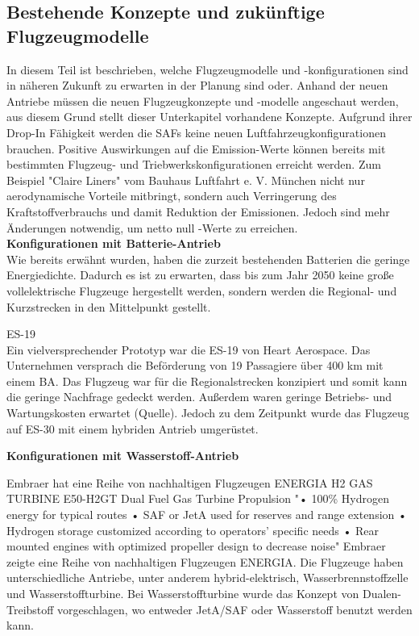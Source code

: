 \subsection{Bestehende Konzepte und zukünftige Flugzeugmodelle}
In diesem Teil ist beschrieben, welche Flugzeugmodelle und -konfigurationen sind in näheren Zukunft zu erwarten in der Planung sind oder.
Anhand der neuen Antriebe müssen die neuen Flugzeugkonzepte und -modelle angeschaut werden, 
aus diesem Grund stellt dieser Unterkapitel vorhandene Konzepte.
Aufgrund ihrer Drop-In Fähigkeit werden die SAFs keine neuen Luftfahrzeugkonfigurationen brauchen.
Positive Auswirkungen auf die Emission-Werte können bereits mit bestimmten Flugzeug- und Triebwerkskonfigurationen erreicht werden.
Zum Beispiel "Claire Liners" vom Bauhaus Luftfahrt e. V. München nicht nur aerodynamische Vorteile mitbringt, 
sondern auch Verringerung des Kraftstoffverbrauchs und damit Reduktion der Emissionen.
Jedoch sind mehr Änderungen notwendig, um netto null \cite{CO2}-Werte zu erreichen.
\\
\textbf{Konfigurationen mit Batterie-Antrieb}\\
Wie bereits erwähnt wurden, haben die zurzeit bestehenden Batterien die geringe Energiedichte. Dadurch es ist zu erwarten, dass bis zum Jahr 
2050 keine große vollelektrische Flugzeuge hergestellt werden, sondern werden die Regional- und Kurzstrecken in den Mittelpunkt gestellt.

ES-19\\
Ein vielversprechender Prototyp war die ES-19 von Heart Aerospace. Das Unternehmen versprach die Beförderung von 19 Passagiere über 400 km mit einem BA. 
Das Flugzeug war für die Regionalstrecken konzipiert und somit kann die geringe Nachfrage gedeckt werden. 
Außerdem waren geringe Betriebs- und Wartungskosten erwartet (Quelle).
Jedoch zu dem Zeitpunkt wurde das Flugzeug auf ES-30 mit einem hybriden Antrieb umgerüstet.


\textbf{Konfigurationen mit Wasserstoff-Antrieb}

Embraer hat eine Reihe von nachhaltigen Flugzeugen ENERGIA H2 GAS TURBINE E50-H2GT Dual Fuel Gas Turbine Propulsion
"• 100\% Hydrogen energy for typical routes
• SAF or JetA used for reserves and range extension
• Hydrogen storage customized according to operators’ specific
needs
• Rear mounted engines with optimized propeller design to
decrease noise"
Embraer zeigte eine Reihe von nachhaltigen Flugzeugen ENERGIA. Die Flugzeuge haben unterschiedliche Antriebe, unter anderem 
hybrid-elektrisch, Wasserbrennstoffzelle und Wasserstoffturbine. Bei Wasserstoffturbine wurde das Konzept von Dualen-Treibstoff vorgeschlagen, 
wo entweder JetA/SAF oder Wasserstoff benutzt werden kann.

